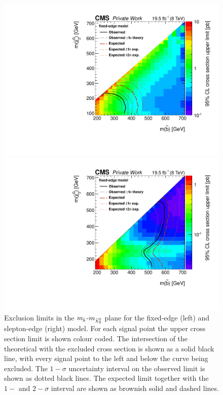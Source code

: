 \begin{figure}[htbp]
\centering
\begin{minipage}[t]{0.49\textwidth}
  \includegraphics[width=\textwidth]{plots/limits/Fixed_Edge_sbottom_neutralino2_Exclusion_witXsecLimit.pdf}
\end{minipage}
\begin{minipage}[t]{0.49\textwidth}
\includegraphics[width=\textwidth]{plots/limits/Fixed_Neutralino_sbottom_neutralino2_Exclusion_witXsecLimit.pdf}
\end{minipage}
\caption{Exclusion limits in the $m_{\tilde{b}}$-$m_{{\tilde{\chi}^0_2}}$ plane for the fixed-edge (left) and slepton-edge (right) model. For each signal point the upper cross section limit is shown colour coded. The intersection of the theoretical with the excluded cross section is shown as a solid black line, with every signal point to the left and below the curve being excluded. The $1-\sigma$ uncertainty interval on the observed limit is shown as dotted black lines. The expected limit together with the $1-$ and $2-\sigma$ interval are shown as brownish solid and dashed lines.}
\label{fig:limits}
\end{figure}